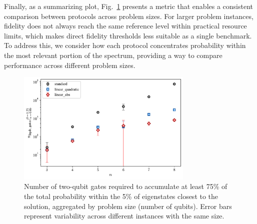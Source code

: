Finally, as a summarizing plot, Fig.~\ref{fig:accumulated_probability} presents a metric that
enables a consistent comparison between protocols across problem sizes. For larger problem instances,
fidelity does not always reach the same reference level within practical resource limits,
which makes direct fidelity thresholds less suitable as a single benchmark. To address this,
we consider how each protocol concentrates probability within the most relevant portion of
the spectrum, providing a way to compare performance across different problem sizes.

\begin{figure}[h]
    \centering
    \includegraphics[width=0.75\textwidth]{04-results/figs/accumulated_probability.pdf}
    \caption{Number of two-qubit gates required to accumulate at least 75\% of the total probability
    within the 5\% of eigenstates closest to the solution, aggregated by problem size (number of qubits).
    Error bars represent variability across different instances with the same size.}
    \label{fig:accumulated_probability}
\end{figure}